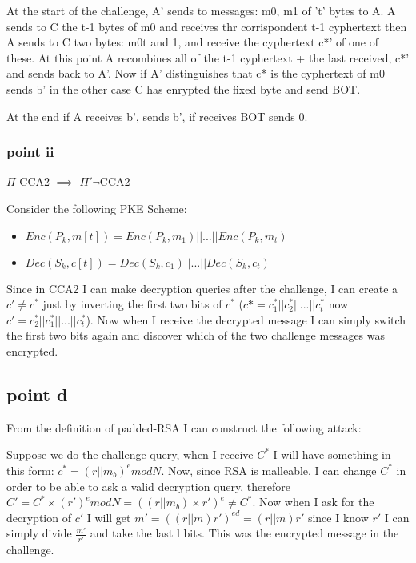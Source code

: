 At the start of the challenge, A' sends to messages: m0, m1 of 't' bytes to A.
A sends to C the t-1 bytes of m0 and receives thr corrispondent t-1 cyphertext then A sends to C two bytes:
m0t and 1, and receive the cyphertext c*' of one of these.
At this point A recombines all of the t-1 cyphertext + the last received, c*' and sends back to A'.
Now if A' distinguishes that c* is the cyphertext of m0 sends b' in the other case C has enrypted the fixed byte and send BOT.

At the end if A receives b', sends b', if receives BOT sends 0.

\subsubsection{point ii}

$\Pi$ CCA2 $\implies$ $\Pi' \neg$CCA2

Consider the following PKE Scheme:
\begin{itemize}
    \item $Enc(P_k,m[t])=Enc(P_k,m_1)||...||Enc(P_k,m_t)$
    \item $Dec(S_k,c[t])=Dec(S_k,c_1)||...||Dec(S_k,c_t)$
\end{itemize}
Since in CCA2 I can make decryption queries after the challenge, I can create a $c'\neq c^*$ just by inverting the first two bits of $c^*$ ($c*=c_1^*||c_2^*||...||c^*_t$ now $c'=c_2^*||c_1^*||...||c^*_t$). Now when I receive the decrypted message I can simply switch the first two bits again and discover which of the two challenge messages was encrypted.

\subsection{point d}

From the definition of padded-RSA I can construct the following attack:

Suppose we do the challenge query, when I receive $C^*$ I will have something in this form: $c^*=(r||m_b)^e mod N$. Now, since RSA is malleable, I can change $C^*$ in order to be able to ask a valid decryption query, therefore $C'=C^*\times(r')^e mod N= ((r||m_b) \times r')^e\neq C^*$. Now when I ask for the decryption of $c'$ I will get $m'=((r||m)r')^{ed}=(r||m)r'$ since I know $r'$ I can simply divide $\frac{m'}{r'}$ and take the last l bits. This was the encrypted message in the challenge. 